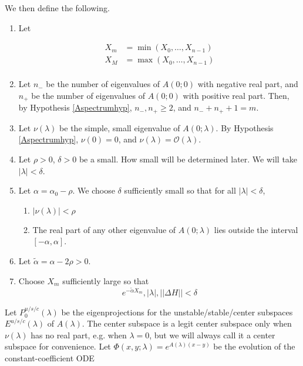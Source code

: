 \documentclass[12pt]{article}
\begin{document}
We then define the following.

\begin{enumerate}
	\item Let

	\begin{align*}
	X_m &= \min(X_0, \dots, X_{n-1}) \\
	X_M &= \max(X_0, \dots, X_{n-1}) \\
	\end{align*}

	\item Let $n_-$ be the number of eigenvalues of $A(0; 0)$ with negative real part, and $n_+$ be the number of eigenvalues of $A(0; 0)$ with positive real part. Then, by Hypothesis \ref{Aspectrumhyp}, $n_-, n_+ \geq 2$, and $n_- + n_+ + 1 = m$.

	\item Let $\nu(\lambda)$ be the simple, small eigenvalue of $A(0; \lambda)$. By Hypothesis \ref{Aspectrumhyp}, $\nu(0) = 0$, and $\nu(\lambda) = \mathcal{O}(\lambda)$. 

	\item Let $\rho > 0$, $\delta > 0$ be a small. How small will be determined later. We will take $|\lambda| < \delta$.

	\item Let $\alpha = \alpha_0 - \rho$. We choose $\delta$ sufficiently small so that for all $|\lambda| < \delta$,

	\begin{enumerate}
		\item $|\nu(\lambda)| < \rho$
		\item The real part of any other eigenvalue of $A(0; \lambda)$ lies outside the interval $[-\alpha, \alpha]$.
	\end{enumerate}

	\item Let $\tilde{\alpha} = \alpha - 2 \rho > 0$.

	\item Choose $X_m$ sufficiently large so that
	\begin{equation}
	e^{-\tilde{\alpha} X_m}, |\lambda|, ||\Delta H|| < \delta
	\end{equation}

\end{enumerate}

Let $P^{u/s/c}_0(\lambda)$ be the eigenprojections for the unstable/stable/center subspaces $E^{u/s/c}(\lambda)$ of $A(\lambda)$. The center subspace is a legit center subspace only when $\nu(\lambda)$ has no real part, e.g. when $\lambda = 0$, but we will always call it a center subspace for convenience. Let $\Phi(x, y; \lambda) = e^{A(\lambda)(x-y)}$ be the evolution of the constant-coefficient ODE
\end{document}
